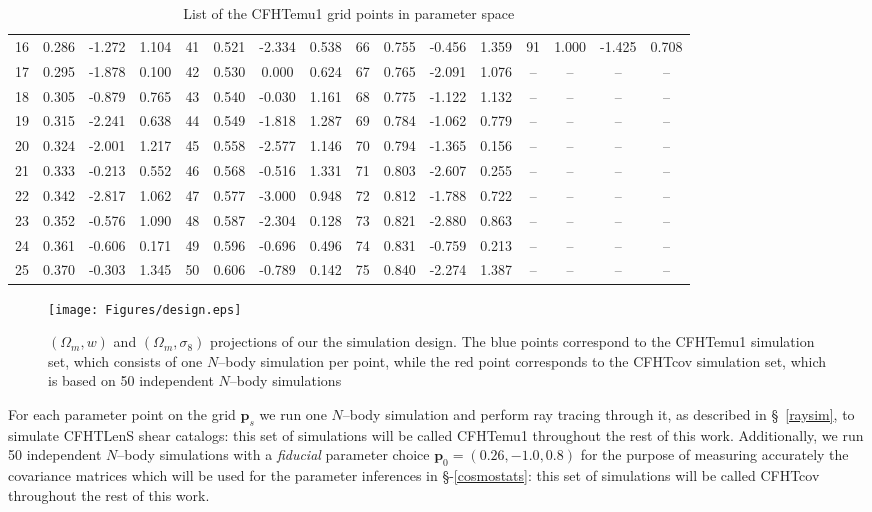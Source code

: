 \documentclass[reprint,aps,prd,superscriptaddress,showkeys,showpacs]{revtex4-1}
\begin{document}
\begin{table*}
\begin{tabular}{c|ccc||c|ccc||c|ccc||c|ccc}
16 & 0.286 & -1.272 & 1.104 & 41 & 0.521 & -2.334 & 0.538 & 66 & 0.755 & -0.456 & 1.359 & 91 & 1.000 & -1.425 & 0.708 \\
17 & 0.295 & -1.878 & 0.100 & 42 & 0.530 & 0.000 & 0.624 & 67 & 0.765 & -2.091 & 1.076 & -- & -- & -- & -- \\
18 & 0.305 & -0.879 & 0.765 & 43 & 0.540 & -0.030 & 1.161 & 68 & 0.775 & -1.122 & 1.132 & -- & -- & -- & -- \\
19 & 0.315 & -2.241 & 0.638 & 44 & 0.549 & -1.818 & 1.287 & 69 & 0.784 & -1.062 & 0.779 & -- & -- & -- & -- \\
20 & 0.324 & -2.001 & 1.217 & 45 & 0.558 & -2.577 & 1.146 & 70 & 0.794 & -1.365 & 0.156 & -- & -- & -- & -- \\
21 & 0.333 & -0.213 & 0.552 & 46 & 0.568 & -0.516 & 1.331 & 71 & 0.803 & -2.607 & 0.255 & -- & -- & -- & -- \\
22 & 0.342 & -2.817 & 1.062 & 47 & 0.577 & -3.000 & 0.948 & 72 & 0.812 & -1.788 & 0.722 & -- & -- & -- & -- \\
23 & 0.352 & -0.576 & 1.090 & 48 & 0.587 & -2.304 & 0.128 & 73 & 0.821 & -2.880 & 0.863 & -- & -- & -- & -- \\
24 & 0.361 & -0.606 & 0.171 & 49 & 0.596 & -0.696 & 0.496 & 74 & 0.831 & -0.759 & 0.213 & -- & -- & -- & -- \\
25 & 0.370 & -0.303 & 1.345 & 50 & 0.606 & -0.789 & 0.142 & 75 & 0.840 & -2.274 & 1.387 & -- & -- & -- & -- \\
\end{tabular}
\caption{List of the CFHTemu1 grid points in parameter space}
\label{designtable}
\end{table*}
%
\begin{figure*}
\begin{center}
\texttt{[image: Figures/design.eps]}
\caption{$(\Omega_m,w)$ and $(\Omega_m,\sigma_8)$ projections of our the simulation design. The blue points correspond to the CFHTemu1 simulation set, which consists of one $N$--body simulation per point, while the red point corresponds to the CFHTcov simulation set, which is based on 50 independent $N$--body simulations}
\label{designfig}
\end{center}
\end{figure*}
%
For each parameter point on the grid $\mathbf{p}_s$ we run one $N$--body simulation and perform ray tracing through it, as described in \S~\ref{raysim}, to simulate CFHTLenS shear catalogs: this set of simulations will be called CFHTemu1 throughout the rest of this work. Additionally, we run 50 independent $N$--body simulations with a \textit{fiducial} parameter choice $\mathbf{p}_0=(0.26,-1.0,0.8)$ for the purpose of measuring accurately the covariance matrices which will be used for the parameter inferences in \S-\ref{cosmostats}: this set of simulations will be called CFHTcov throughout the rest of this work.    
\end{document}
